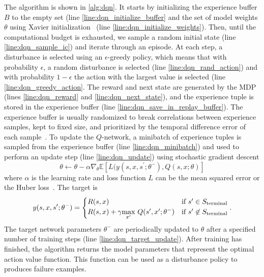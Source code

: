 The algorithm is shown in \cref{alg:dqn}. It starts by initializing the experience buffer $B$ to the empty set (line \ref{line:dqn_initialize_buffer} and the set of model weights $\theta$ using Xavier initialization~\cite{glorot2010understanding} (line \ref{line:dqn_initialize_weights}). Then, until the computational budget is exhausted, we sample a random initial state (line \ref{line:dqn_sample_ic}) and iterate through an episode. At each step, a disturbance is selected using an $\epsilon$-greedy policy, which means that with probability $\epsilon$, a random disturbance is selected (line \ref{line:dqn_rand_action}) and with probability $1-\epsilon$ the action with the largest value is selected (line \ref{line:dqn_greedy_action}. The reward and next state are generated by the MDP (lines \ref{line:dqn_reward} and \ref{line:dqn_next_state}), and the experience tuple is stored in the experience buffer (line \ref{line:dqn_save_in_replay_buffer}). The experience buffer is usually randomized to break correlations between experience samples, kept to fixed size, and prioritized by the temporal difference error of each sample~\cite{schaul2016prioritized}. To update the $Q$-network, a minibatch of experience tuples is sampled from the experience buffer (line \ref{line:dqn_minibatch}) and used to perform an update step (line \ref{line:dqn_update}) using stochastic gradient descent
\begin{equation}
    \theta \gets \theta - \alpha \nabla_{\theta} \mathbb{E}[L(y(s, x, s^\prime; \theta^-), Q(s,x; \theta)]
\end{equation}
where $\alpha$ is the learning rate and loss function $L$ can be the mean squared error or the Huber loss~\cite{huber1992robust}. The target is 
\begin{equation}
    y(s, x, s^\prime; \theta^-) = \begin{cases}
    R(s,x) & \text{if } s^\prime \in S_{\rm terminal} \\ 
    R(s,x) + \gamma \underset{x^\prime}{\max} \  Q(s^\prime, x^\prime;  \theta^-) & \text{if } s^\prime \not \in S_{\rm terminal} \\ 
    \end{cases} \text{.} \label{eq:ch2_dqn_target}
\end{equation}
The target network parameters $\theta^-$ are periodically updated to $\theta$ after a specified number of training steps (line \ref{line:dqn_target_update}). After training has finished, the algorithm returns the model parameters that represent the optimal action value function. This function can be used as a disturbance policy to produces failure examples.

